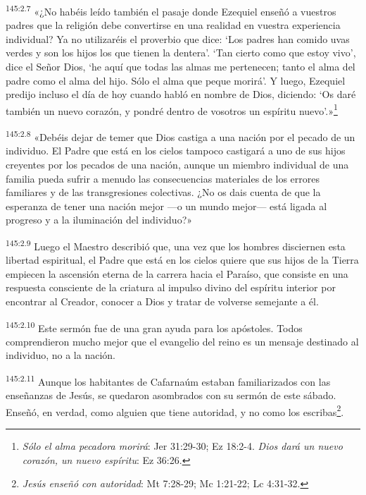 \par 
\textsuperscript{145:2.7} «¿No habéis leído también el pasaje donde Ezequiel enseñó a vuestros padres que la religión debe convertirse en una realidad en vuestra experiencia individual? Ya no utilizaréis el proverbio que dice: `Los padres han comido uvas verdes y son los hijos los que tienen la dentera'. `Tan cierto como que estoy vivo', dice el Señor Dios, `he aquí que todas las almas me pertenecen; tanto el alma del padre como el alma del hijo. Sólo el alma que peque morirá'. Y luego, Ezequiel predijo incluso el día de hoy cuando habló en nombre de Dios, diciendo: `Os daré también un nuevo corazón, y pondré dentro de vosotros un espíritu nuevo'.»\footnote{\textit{Sólo el alma pecadora morirá}: Jer 31:29-30; Ez 18:2-4. \textit{Dios dará un nuevo corazón, un nuevo espíritu}: Ez 36:26.}

\par 
\textsuperscript{145:2.8} «Debéis dejar de temer que Dios castiga a una nación por el pecado de un individuo. El Padre que está en los cielos tampoco castigará a uno de sus hijos creyentes por los pecados de una nación, aunque un miembro individual de una familia pueda sufrir a menudo las consecuencias materiales de los errores familiares y de las transgresiones colectivas. ¿No os dais cuenta de que la esperanza de tener una nación mejor ---o un mundo mejor--- está ligada al progreso y a la iluminación del individuo?»

\par 
\textsuperscript{145:2.9} Luego el Maestro describió que, una vez que los hombres disciernen esta libertad espiritual, el Padre que está en los cielos quiere que sus hijos de la Tierra empiecen la ascensión eterna de la carrera hacia el Paraíso, que consiste en una respuesta consciente de la criatura al impulso divino del espíritu interior por encontrar al Creador, conocer a Dios y tratar de volverse semejante a él.

\par 
\textsuperscript{145:2.10} Este sermón fue de una gran ayuda para los apóstoles. Todos comprendieron mucho mejor que el evangelio del reino es un mensaje destinado al individuo, no a la nación.

\par 
\textsuperscript{145:2.11} Aunque los habitantes de Cafarnaúm estaban familiarizados con las enseñanzas de Jesús, se quedaron asombrados con su sermón de este sábado. Enseñó, en verdad, como alguien que tiene autoridad, y no como los escribas\footnote{\textit{Jesús enseñó con autoridad}: Mt 7:28-29; Mc 1:21-22; Lc 4:31-32.}.

